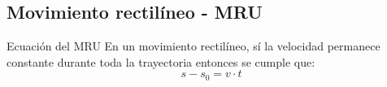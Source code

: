 \subsection*{Movimiento rectilíneo - MRU}
\begin{Theorem*} {Ecuación del MRU}
	En un movimiento rectilíneo, sí la velocidad permanece constante durante toda la trayectoria entonces se cumple que:
	$$ s-s_0=v\cdot t $$
\end{Theorem*}
